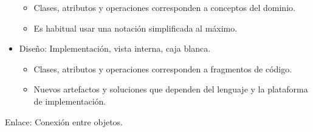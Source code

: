 \documentclass[12pt, twoside, openright]{report} %
\begin{document}
\begin{itemize}
\begin{itemize}
      \item
        Clases, atributos y operaciones corresponden a conceptos del
        dominio.
      \item
        Es habitual usar una notación simplificada al máximo.
      \end{itemize}
    \item
      Diseño: Implementación, vista interna, caja blanca.

      \begin{itemize}
      
      \item
        Clases, atributos y operaciones corresponden a fragmentos de
        código.
      \item
        Nuevos artefactos y soluciones que dependen del lenguaje y la
        plataforma de implementación.
      \end{itemize}
    \end{itemize}

	Enlace: Conexión entre objetos.
\end{document}
